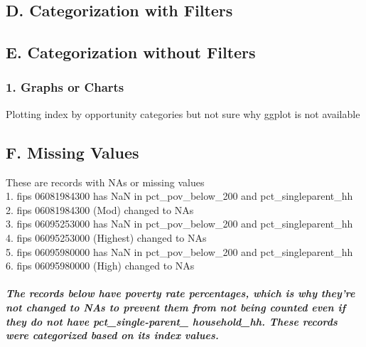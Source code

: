 \documentclass[]{article}
\newenvironment{Shaded}{\begin{snugshade}}{\end{snugshade}}
\newcommand{\DecValTok}[1]{\textcolor[rgb]{0.00,0.00,0.81}{#1}}
\newcommand{\StringTok}[1]{\textcolor[rgb]{0.31,0.60,0.02}{#1}}
\newcommand{\OtherTok}[1]{\textcolor[rgb]{0.56,0.35,0.01}{#1}}
\newcommand{\OperatorTok}[1]{\textcolor[rgb]{0.81,0.36,0.00}{\textbf{#1}}}
\newcommand{\NormalTok}[1]{#1}
\let\oldsubparagraph\subparagraph
\renewcommand{\subparagraph}[1]{\oldsubparagraph{#1}\mbox{}}
\begin{document}
\begin{Shaded}
\begin{Highlighting}[]
{{{{{{\NormalTok{nan_records}\OperatorTok{$}\NormalTok{category_}\DecValTok{2}\NormalTok{ <-}\StringTok{ }\OtherTok{NA}
\end{Highlighting}
\end{Shaded}

\subsection{D. Categorization with
Filters}\label{d.-categorization-with-filters}

\subsection{E. Categorization without
Filters}\label{e.-categorization-without-filters}

\subsubsection{1. Graphs or Charts}\label{graphs-or-charts}

Plotting index by opportunity categories but not sure why ggplot is not
available

\subsection{F. Missing Values}\label{f.-missing-values}

These are records with NAs or missing values\\
1. fips 06081984300 has NaN in pct\_pov\_below\_200 and
pct\_singleparent\_hh\\
2. fips 06081984300 (Mod) changed to NAs\\
3. fips 06095253000 has NaN in pct\_pov\_below\_200 and
pct\_singleparent\_hh\\
4. fips 06095253000 (Highest) changed to NAs\\
5. fips 06095980000 has NaN in pct\_pov\_below\_200 and
pct\_singleparent\_hh\\
6. fips 06095980000 (High) changed to NAs

\subparagraph{The records below have poverty rate percentages, which is
why they're not changed to NAs to prevent them from not being counted
even if they do not have pct\_single-parent\_ household\_hh. These
records were categorized based on its index
values.}\label{the-records-below-have-poverty-rate-percentages-which-is-why-theyre-not-changed-to-nas-to-prevent-them-from-not-being-counted-even-if-they-do-not-have-pct_single-parent_-household_hh.-these-records-were-categorized-based-on-its-index-values.}
\end{document}
